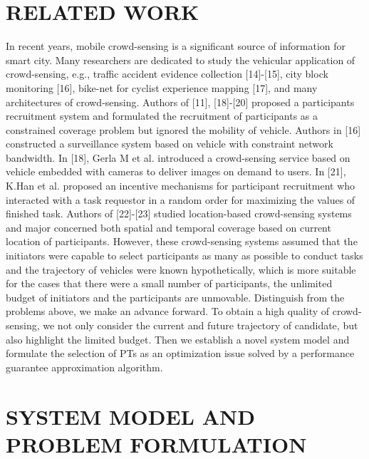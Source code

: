 \documentclass[journal]{IEEEtran}
\begin{document}
\section{RELATED WORK}
In recent years, mobile crowd-sensing is a significant source of information for smart city. Many researchers are dedicated to study the vehicular application of crowd-sensing, e.g., traffic accident evidence collection [14]-[15], city block monitoring [16], bike-net for cyclist experience mapping [17], and many architectures of crowd-sensing. Authors of [11], [18]-[20] proposed a participants recruitment system and formulated the recruitment of participants as a constrained coverage problem but ignored the mobility of vehicle. Authors in [16] constructed a surveillance system based on vehicle with constraint network bandwidth. In [18], Gerla M et al. introduced a crowd-sensing service based on vehicle embedded with cameras to deliver images on demand to users. In [21], K.Han et al. proposed an incentive mechanisms for participant recruitment who interacted with a task requestor in a random order for maximizing the values of finished task. Authors of [22]-[23] studied location-based crowd-sensing systems and major concerned both spatial and temporal coverage based on current location of participants. However,  these crowd-sensing systems assumed that the initiators were capable to select participants as many as possible to conduct tasks and the trajectory of vehicles were known hypothetically, which is more suitable for the cases that there were a small number of participants,  the unlimited budget of initiators and the participants are unmovable. Distinguish from the problems above, we make an advance forward. To obtain a high quality of crowd-sensing, we not only consider the current and future trajectory of candidate, but also highlight the limited budget. Then we establish a novel system model and formulate the selection of PTs as an optimization issue solved by a performance guarantee approximation algorithm.
\section{SYSTEM MODEL AND PROBLEM FORMULATION}
\end{document}
